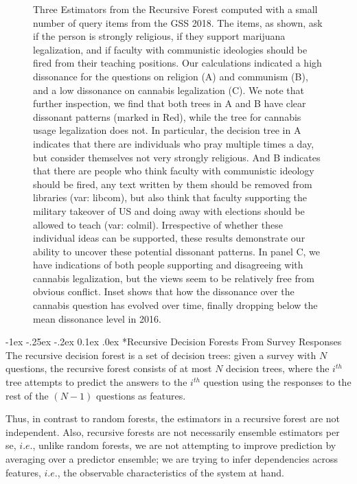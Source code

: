 \documentclass[onecolumn, compsoc,11pt]{IEEEtran}
\makeatletter
\renewcommand\subsection{\@startsection {section}{1}{\z@}%
                                   {-1ex \@plus -.25ex \@minus -.2ex}%
                                   {0.1ex \@plus.0ex}%
                                   {\fontsize{11}{10}\selectfont\bfseries\sffamily\color{DodgerBlue4}}}
\renewcommand{\captionN}[1]{\caption{\color{CadetBlue4!80!black} \sffamily \fontsize{10}{11}\selectfont #1  }}
\makeatother
\begin{document}
\begin{figure}
  
  \captionN{Three Estimators from the Recursive Forest computed with a small number of query items from the GSS 2018. The items, as shown, ask if the person is strongly religious, if they support marijuana legalization, and if faculty with communistic ideologies should be fired from their teaching positions. Our calculations indicated a high dissonance for the questions on religion (A) and communism (B), and a low dissonance on cannabis legalization (C).  We note that further inspection, we find that both trees in A and B have clear dissonant patterns (marked in Red), while the tree for cannabis usage legalization does not. In particular, the decision tree in A indicates that there are individuals who pray multiple times a day, but consider themselves not very strongly religious. And B indicates that there are people who think faculty with communistic ideology should be fired, any text written by them should be removed from libraries (var: libcom), but also think that faculty supporting the military takeover of US and doing away with elections should be allowed to teach (var: colmil). Irrespective of whether these individual ideas can be supported, these results demonstrate our ability to uncover these potential dissonant patterns. In panel C, we have indications of both people supporting and disagreeing with cannabis legalization, but the views seem to be relatively free from obvious conflict. Inset shows that how the dissonance over the cannabis question has evolved over time, finally dropping below the mean dissonance level in 2016.}\label{fig0}
  \vspace{-20pt}
\end{figure}
\subsection*{Recursive Decision Forests From Survey Responses}
The recursive decision forest is a set of decision trees: given a survey with $N$ questions, the recursive forest consists of at most $N$ decision trees, where the $i^{th}$ tree attempts to predict the answers to the $i^{th}$ question using the responses to the rest of the $(N-1)$ questions as features.

Thus, in contrast to  random forests, the estimators in a recursive forest are not independent. Also,  recursive forests are not necessarily ensemble estimators per se, $i.e.$, unlike random forests, we are not attempting to improve prediction by averaging over a predictor ensemble;  we are trying to infer dependencies across features, $i.e.$, the observable characteristics of the system at hand.
\end{document}
